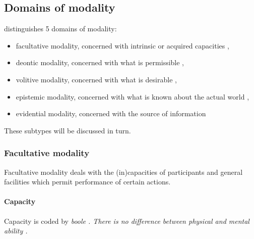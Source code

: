 \subsection{Domains of modality}\label{sec:func:Modality:domains}
\citet{Hengeveld2004imm} distinguishes 5 domains of modality:

\begin{itemize}
 \item facultative modality, concerned with intrinsic or acquired capacities ,
 \item deontic modality, concerned with what is permissible ,
 \item volitive modality, concerned with what is desirable ,
 \item epistemic modality, concerned with what is known about the actual world ,
 \item evidential modality, concerned with the source of information 
\end{itemize}
 
These subtypes will be discussed in turn.
 
\subsubsection[Facultative]{Facultative modality}\label{sec:func:Facultativemodality}
Facultative modality deals with the (in)capacities of participants and general facilities which permit performance of certain actions.

\paragraph{Capacity}\label{sec:func:Capacity}
Capacity is coded by \em boole \em {}. There is no difference between physical   and mental ability  .







